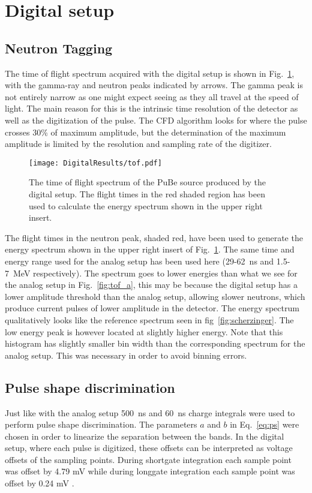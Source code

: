 \documentclass[main.tex]{subfiles}
\begin{document}
\section{Digital setup}

\subsection{Neutron Tagging}
The time of flight spectrum acquired with the digital setup is shown in Fig.~\ref{fig:tof_d}, with the gamma-ray and neutron peaks indicated by arrows. The gamma peak is not entirely narrow as one might expect seeing as they all travel at the speed of light. The main reason for this is the intrinsic time resolution of the detector as well as the digitization of the pulse. The CFD algorithm looks for where the pulse crosses 30\% of maximum amplitude, but the determination of the maximum amplitude is limited by the resolution and sampling rate of the digitizer.

\begin{figure}[ht]
    \centering
        \texttt{[image: DigitalResults/tof.pdf]}
        \caption[Time of flight spectrum, digital setup.]{The time of flight spectrum of the PuBe source produced by the digital setup. The flight times in the red shaded region has been used to calculate the energy spectrum shown in the upper right insert.}
    \label{fig:tof_d} 
\end{figure}

The flight times in the neutron peak, shaded red, have been used to generate the energy spectrum shown in the upper right insert of Fig.~\ref{fig:tof_d}. The same time and energy range used for the analog setup has been used here (29-\SI{62}{\ns} and 1.5-\SI{7}{\MeV} respectively). The spectrum goes to lower energies than what we see for the analog setup in Fig.~\ref{fig:tof_a}, this may be because the digital setup has a lower amplitude threshold than the analog setup, allowing slower neutrons, which produce current pulses of lower amplitude in the detector. The energy spectrum qualitatively looks like the reference spectrum seen in fig~\ref{fig:scherzinger}. The low energy peak is however located at slightly higher energy. Note that this histogram has slightly smaller bin width than the corresponding spectrum for the analog setup. This was necessary in order to avoid binning errors.

\subsection{Pulse shape discrimination}
Just like with the analog setup \SI{500}{ns} and \SI{60}{ns} charge integrals were used to perform pulse shape discrimination. The parameters $a$ and $b$ in Eq.~\ref{eq:ps} were chosen in order to linearize the separation between the bands. In the digital setup, where each pulse is digitized, these offsets can be interpreted as voltage offsets of the sampling points. During shortgate integration each sample point was offset by 4.79 mV while during longgate integration each sample point was offset by 0.24 mV .
\end{document}
